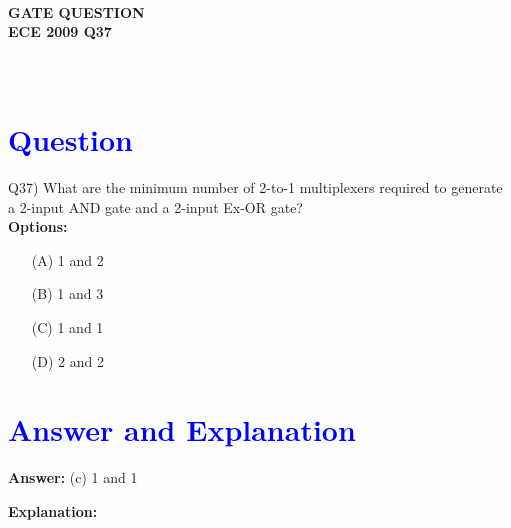 \documentclass[a4paper,12pt]{article}
\begin{document}
\pagestyle{empty} %

\thispagestyle{fancy} %
\fancyhf{} %
\renewcommand{\headrulewidth}{0pt} %


\vspace{10cm}
\begin{center}
   
    {\LARGE \textbf{\textcolor{darkskyblue}{\\  GATE QUESTION \\ ECE 2009 Q37}}}
\end{center}
\vspace{-1cm} %

\section*{\textcolor{blue}{\\Question}}
Q37) What are the minimum number of 2-to-1 multiplexers required to generate a 2-input AND gate and a 2-input Ex-OR gate?\\

\hspace{-0.5cm}\textbf{Options:}
\begin{enumerate}
 \item[(A)] 1 and 2
    \item[(B)] 1 and 3
    \item[(C)] 1 and 1
    \item[(D)] 2 and 2
\end{enumerate}
\vspace{1cm}
\section*{\textcolor{blue}{Answer and Explanation}}

\textbf{Answer:} (c) 1 and 1
\vspace{0.5cm}

\textbf{Explanation:}
\end{document}

